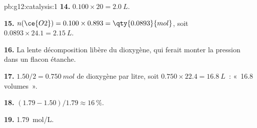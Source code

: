 \begin{solution}{pb:g12:catalysis:1}
\textbf{14.} $0.100 \times 20 = \qty{2.0}{L}$.

\textbf{15.} $n(\ce{O2}) = 0.100 \times 0.893 = \qty{0.0893}{mol}$,
soit $0.0893 \times 24.1 = \qty{2.15}{L}$.

\textbf{16.} La lente décomposition libère du dioxygène, qui ferait
monter la pression dans un flacon étanche.

\textbf{17.} $1.50 / 2 = \qty{0.750}{mol}$ de dioxygène par litre, soit
$0.750 \times 22.4 = \qty{16.8}{L}$~: «~16.8 volumes~».

\textbf{18.} $(1.79 - 1.50)/1.79 \approx \qty{16}{\percent}$.

\textbf{19.} \qty{1.79}{mol/L}.
\end{solution}
